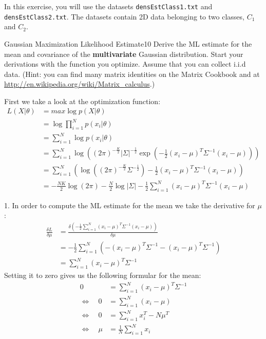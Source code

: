 \newif\ifvimbug
\vimbugfalse

\ifvimbug

\fi

In this exercise, you will use the datasets \texttt{densEstClass1.txt} 
and \texttt{densEstClass2.txt}. The datasets contain 2D data belonging
to two classes, $C_1$ and $C_2$.

\begin{questions}


\begin{question}{Gaussian Maximization Likelihood Estimate}{10}
Derive the ML estimate for the mean and covariance of the \textbf{multivariate} Gaussian distribution. Start your derivations with the function you optimize. Assume that you can collect i.i.d data. (Hint: you can find many matrix identities on the Matrix Cookbook and at \url{http://en.wikipedia.org/wiki/Matrix_calculus}.)

\begin{answer}

First we take a look at the optimization function:\\
\begin{align*}
L(X | \theta ) &= max \log p(X|\theta ) \\
&= \log \prod_{i=1}^{N} p(x_i|\theta ) \\
&= \sum_{i=1}^{N} \log p(x_i|\theta ) \\
&= \sum_{i=1}^{N} \log \left( (2\pi )^{-\frac{K}{2}} |\Sigma |^{-\frac{1}{2}} \exp (-\frac{1}{2}(x_i-\mu )^{T} \Sigma^{-1}(x_i-\mu )) \right) \\
&= \sum_{i=1}^{N} \left( \log ((2\pi )^{-\frac{K}{2}}\Sigma^{-\frac{1}{2}})-\frac{1}{2} (x_i-\mu )^T \Sigma^{-1}(x_i-\mu) \right) \\
&= -\frac{N K}{2} \log (2\pi )-\frac{N}{2} \log |\Sigma |-\frac{1}{2}\sum_{i=1}^{N}(x_i-\mu )^T \Sigma^{-1}(x_i-\mu )
\end{align*}

1. In order to compute the ML estimate for the mean we take the derivative for $\mu $:
\begin{align*}
\frac{\delta L}{\delta \mu} &= \frac{\delta(-\frac{1}{2}\sum_{i=1}^{N}(x_i-\mu )^T \Sigma^{-1} (x_i-\mu ))}{\delta \mu} \\
&= -\frac{1}{2} \sum_{i=1}^{N}(-(x_i-\mu )^T \Sigma^{-1}-(x_i-\mu )^T \Sigma^{-1}) \\
&= \sum_{i=1}^{N}(x_i-\mu )^T\Sigma^{-1}
\end{align*}
Setting it to zero gives us the following formular for the mean:
\begin{align*}
0 &= \sum_{i=1}^{N}(x_i-\mu )^T\Sigma^{-1} \\
\Leftrightarrow \quad 0 &= \sum_{i=1}^{N}(x_i-\mu ) \\
\Leftrightarrow \quad 0 &= \sum_{i=1}^{N}x_i^T-N\mu^T \\
\Leftrightarrow \quad \mu &= \frac{1}{N}\sum_{i=1}^{N}x_i 
\end{align*}


\end{answer}
\end{question}
\end{questions}
